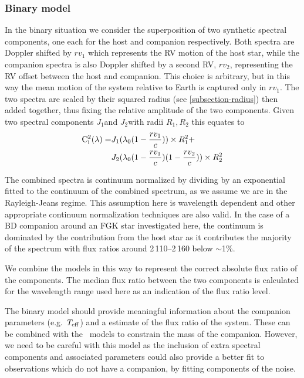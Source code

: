 \subsubsection{Binary model}
\label{subsubsec:binary-model}
In the binary situation we consider the superposition of two synthetic spectral components, one each for the host and companion respectively.
Both spectra are Doppler shifted by \({rv}_1\) which represents the {RV} motion of the host star, while the companion spectra is also Doppler shifted by a second {RV}, \({rv}_2\), representing the {RV} offset between the host and companion.
This choice is arbitrary, but in this way the mean motion of the system relative to Earth is captured only in \({rv}_1\).
The two spectra are scaled by their squared radius (see \cref{subsection-radius}) then added together, thus fixing the relative amplitude of the two components.
Given two spectral components \(J_{1}\)and \(J_{2}\)with radii \(R_1, R_2\) this equates to
\begin{align}
\rm C^{2}_{i}(\lambda) = &  J_{1}(\lambda_{0}(1 - \frac{rv_{1}}{c}))\times R_{1}^2 +\nonumber \\
& J_{2}(\lambda_{0}(1-\frac{rv_{1}}{c})(1-\frac{rv_{2}}{c}))\times R_{2}^2
\end{align}


The combined spectra is continuum normalized by dividing by an exponential fitted to the continuum of the combined spectrum, as we assume we are in the Rayleigh-Jeans regime.
This assumption here is wavelength dependent and other appropriate continuum normalization techniques are also valid.
In the case of a {BD} companion around an FGK star investigated here, the continuum is dominated by the contribution from the host star as it contributes the majority of the spectrum with flux ratios around 2\,110--2\,160\nm{} below \(\sim\)1\%.

We combine the models in this way to represent the correct absolute flux ratio of the components.
The median flux ratio between the two components is calculated for the wavelength range used here as an indication of the flux ratio level.

The binary model should provide meaningful information about the companion parameters (e.g.\ \(T_{\mathrm{eff}}{}\)) and a estimate of the flux ratio of the system.
These can be combined with the~\citet{baraffe_evolutionary_2003} models to constrain the mass of the companion.
However, we need to be careful with this model as the inclusion of extra spectral components and associated parameters could also provide a better fit to observations which do not have a companion, by fitting components of the noise.\\

